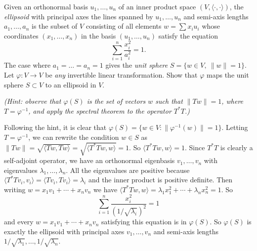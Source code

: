 \begin{problem}
Given an orthonormal basis $u_1,\dots,u_n$ of an inner product space $(V,\langle\cdot,\cdot\rangle)$, the {\em ellipsoid} with principal axes the lines spanned by $u_1,\dots,u_n$ and semi-axis lengths $a_1,\dots,a_n$ is the subset of $V$ consisting of all elements $w=\sum x_i u_i$ whose coordinates $(x_1,\dots,x_n)$ in the basis $(u_1,\dots,u_n)$ satisfy the equation 
\[\sum_{i=1}^n \frac{x_i^2}{a_i^2}=1.\] 
The case where $a_1=\dots=a_n=1$ gives the {\em unit sphere} $S=\{w\in V,\ \|w\|=1\}$. Let $\varphi:V\to V$ be {\em any} invertible linear transformation.  Show that $\varphi$ maps the unit sphere $S\subset V$ to an ellipsoid in $V$.
\end{problem}

\textit{(Hint: observe that $\varphi(S)$ is the set of vectors $w$ such that
$\|Tw\|=1$, where $T=\varphi^{-1}$, and apply the spectral theorem to the operator $T^*T$.)}

Following the hint, it is clear that $\varphi(S)=\{w\in V : \| \varphi^{-1}(w)\|=1\}$. Letting $T=\varphi^{-1}$, we can rewrite the condition $w\in S$ as $\|Tw\|=\sqrt{\langle Tw, Tw \rangle}=\sqrt{\langle T^*Tw, w \rangle}=1$. So $\langle T^*Tw, w\rangle=1$. Since $T^*T$ is clearly a self-adjoint operator, we have an orthonormal eigenbasis $v_1,\ldots,v_n$ with eigenvalues $\lambda_1,\ldots,\lambda_n$. All the eigenvalues are positive because $\langle T^*Tv_i, v_i\rangle = \langle Tv_i, Tv_i\rangle = \lambda_i$ and the inner product is positive definite. Then writing $w=x_1v_1+\cdots+x_nv_n$ we have $\langle T^*Tw, w\rangle = \lambda_1x_1^2+\cdots+\lambda_nx_n^2=1$. So
\[
  \sum^n_{i=1}\frac{x_i^2}{(1/\sqrt{\lambda_i})^2}=1
\]
and every $w=x_1v_1+\cdots+x_nv_n$ satisfying this equation is in $\varphi(S)$. So $\varphi(S)$ is exactly the ellipsoid with principal axes $v_1,\ldots,v_n$ and semi-axis lengths $1/\sqrt{\lambda_1},\ldots,1/\sqrt{\lambda_n}$.            